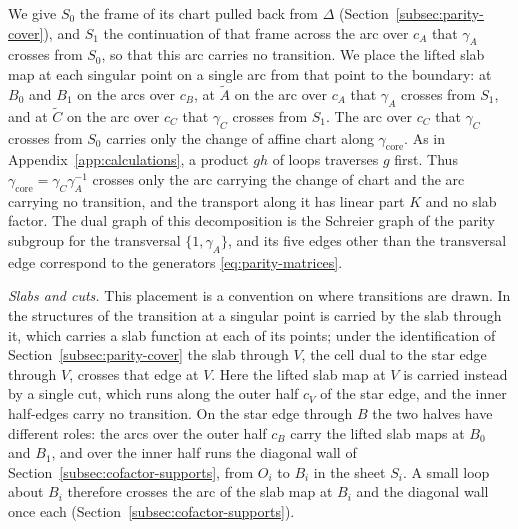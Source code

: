 We give $S_0$ the frame of its chart pulled back from $\Delta$
(Section~\ref{subsec:parity-cover}), and $S_1$ the continuation of that
frame across the arc over $c_A$ that $\gamma_A$ crosses from $S_0$, so that
this arc carries no transition.  We place the lifted slab map at each singular
point on a single arc from that point to the boundary: at $B_0$ and $B_1$ on
the arcs over $c_B$, at $\widetilde A$ on the arc over $c_A$ that $\gamma_A$
crosses from $S_1$, and at $\widetilde C$ on the arc over $c_C$ that
$\gamma_C$ crosses from $S_1$.  The arc over $c_C$ that $\gamma_C$ crosses
from $S_0$ carries only the change of affine chart along
$\gamma_{\mathrm{core}}$.  As in Appendix~\ref{app:calculations}, a product
$gh$ of loops traverses $g$ first.  Thus $\gamma_{\mathrm{core}}=\gamma_C\gamma_A^{-1}$
crosses only the arc carrying the change of chart and the arc carrying no
transition, and the transport along it has linear part $K$ and no slab
factor.  The dual graph of this decomposition is the Schreier graph of the
parity subgroup for the transversal $\{1,\gamma_A\}$, and its five edges
other than the transversal edge correspond to the generators
\eqref{eq:parity-matrices}.

\emph{Slabs and cuts.}  This placement is a convention on where transitions
are drawn.  In the structures of \cite{grosssiebert2011} the transition at
a singular point is carried by the slab through it, which carries a slab
function at each of its points; under the identification of
Section~\ref{subsec:parity-cover} the slab through $V$, the cell dual to the
star edge through $V$, crosses that edge at $V$.  Here the lifted slab map
at $V$ is carried instead by a single cut, which runs along the outer half
$c_V$ of the star edge, and the inner half-edges carry no transition.  On
the star edge through $B$ the two halves have different roles: the arcs
over the outer half $c_B$ carry the lifted slab
maps at $B_0$ and $B_1$, and over the inner half runs the diagonal wall of
Section~\ref{subsec:cofactor-supports}, from $O_i$ to $B_i$ in the sheet
$S_i$.  A small loop about $B_i$ therefore crosses the arc of the slab map
at $B_i$ and the diagonal wall once each
(Section~\ref{subsec:cofactor-supports}).

